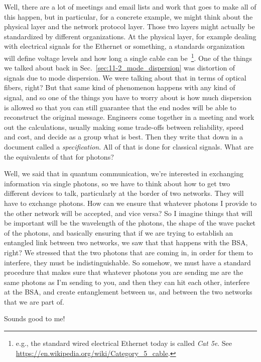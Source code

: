\rrr Well, there are a lot of meetings and email lists and work that goes to make all of this happen, but in particular, for a concrete example, we might think about the physical layer and the network protocol layer. Those two layers might actually be standardized by different organizations. At the physical layer, for example dealing with electrical signals for the Ethernet or something,  a standards organization will define voltage levels and how long a single cable can be~\footnote{e.g., the standard wired electrical Ethernet today is called \emph{Cat 5e}. See \url{https://en.wikipedia.org/wiki/Category_5_cable}.}. One of the things we talked about back in Sec.~\ref{sec:11-2_mode_dispersion} was distortion of signals due to mode dispersion. We were talking about that in terms of optical fibers, right? But that same kind of phenomenon happens with any kind of signal, and so one of the things you have to worry about is how much dispersion is allowed so that you can still guarantee that the end nodes will be able to reconstruct the original message. Engineers come together in a meeting and work out the calculations, usually making some trade-offs between reliability, speed and cost, and decide as a group what is best.  Then they write that down in a document called a \emph{specification}. All of that is done for classical signals. What are the equivalents of that for photons?

\mmm Well, we said that in quantum communication, we're interested in exchanging information via single photons, so we have to think about how to get two different devices to talk, particularly at the border of two networks. They will have to exchange photons. How can we ensure that whatever photons I provide to the other network will be accepted, and vice versa? So I imagine things that will be important will be the wavelength of the photons, the shape of the wave packet of the photons, and basically ensuring that if we are trying to establish an entangled link between two networks, we saw that that happens with the BSA, right? We stressed that the two photons that are coming in, in order for them to interfere, they must be indistinguishable. So somehow, we must have a standard procedure that makes sure that whatever photons you are sending me are the same photons as I'm sending to you, and then they can hit each other, interfere at the BSA, and create entanglement between us, and between the two networks that we are part of.

\rrr Sounds good to me!

